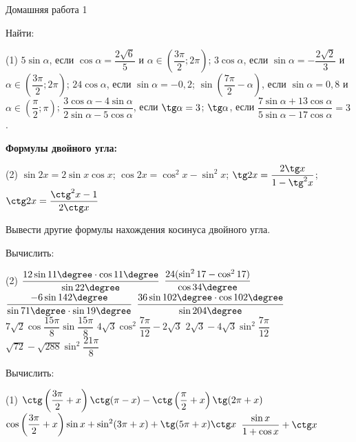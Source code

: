 \begin{homework}[number=1]
	\begin{listofex}
		\item Домашняя работа 1
	\end{listofex}
\end{homework}

\begin{class}[number=3]
	\begin{listofex}
		\item Найти:
		\begin{tasks}(1)
			\task \( 5\sin\alpha \), \quad если \( \cos\alpha=\dfrac{2\sqrt{6}}{5} \) и \( \alpha\in\left( \dfrac{3\pi}{2}; 2\pi \right) \);
			\task \( 3\cos\alpha \), \quad если \( \sin\alpha=-\dfrac{2\sqrt{2}}{3} \) и \( \alpha\in\left( \dfrac{3\pi}{2}; 2\pi \right) \);
			\task \( 24\cos\alpha \), \quad если \( \sin\alpha=-0,2 \);
			\task \( \sin\left( \dfrac{7\pi}{2}-\alpha \right) \), \quad если \( \sin\alpha=0,8 \) и \( \alpha\in\left( \dfrac{\pi}{2}; \pi \right) \);			
			\task \( \dfrac{3\cos\alpha-4\sin\alpha}{2\sin\alpha-5\cos\alpha} \), \quad если \( \tg\alpha=3 \);
			\task \( \tg\alpha \), \quad если \( \dfrac{7\sin\alpha+13\cos\alpha}{5\sin\alpha-17\cos\alpha}=3 \).
		\end{tasks}
		\item \textbf{Формулы двойного угла:}
		\begin{tasks}(2)
			\task \( \sin2x=2\sin x\cos x \);
			\task \( \cos2x=\cos^2x-\sin^2x \);
			\task \( \tg2x=\dfrac{2\tg x}{1-\tg^2x} \);
			\task \( \ctg2x=\dfrac{\ctg^2x-1}{2\ctg x} \)
		\end{tasks}
		\item Вывести другие формулы нахождения косинуса двойного угла.
		\item Вычислить:
		\begin{tasks}(2)
			\task \( \dfrac{12\sin11\degree\cdot\cos11\degree}{\sin22\degree} \)
			\task \( \dfrac{24(\sin^217-\cos^217)}{\cos34\degree} \)
			\task \( \dfrac{-6\sin142\degree}{\sin71\degree\cdot\sin19\degree} \)
			\task \( \dfrac{36\sin102\degree\cdot\cos102\degree}{\sin204\degree} \)
			\task \( 7\sqrt{2}\cos\dfrac{15\pi}{8}\sin\dfrac{15\pi}{8} \)
			\task \( 4\sqrt{3}\cos^2\dfrac{7\pi}{12}-2\sqrt{3} \)
			\task \( 2\sqrt{3}-4\sqrt{3}\sin^2\dfrac{7\pi}{12} \)
			\task \( \sqrt{72}-\sqrt{288}\sin^2\dfrac{21\pi}{8} \)
		\end{tasks}
	\item Вычислить:
	\begin{tasks}(1)
		\task \( \ctg\left( \dfrac{3\pi}{2}+x \right)\ctg(\pi-x)-\ctg\left( \dfrac{\pi}{2}+x \right)\tg(2\pi+x) \)
		\task \( \cos\left( \dfrac{3\pi}{2}+x \right)\sin x + \sin^2(3\pi+x)+\tg(5\pi+x)\ctg x \)
		\task \( \dfrac{\sin x}{1+\cos x}+\ctg x \)
	\end{tasks}
	\end{listofex}
\end{class}

